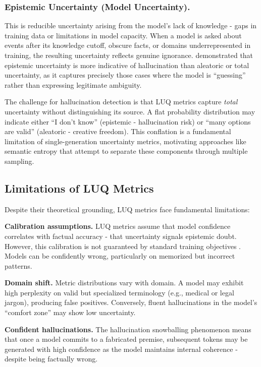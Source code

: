 \subsubsection{Epistemic Uncertainty (Model Uncertainty).} This is reducible uncertainty arising from the model's lack of knowledge - gaps in training data or limitations in model capacity. When a model is asked about events after its knowledge cutoff, obscure facts, or domains underrepresented in training, the resulting uncertainty reflects genuine ignorance. \citet{xiao-wang-2021-hallucination} demonstrated that epistemic uncertainty is more indicative of hallucination than aleatoric or total uncertainty, as it captures precisely those cases where the model is ``guessing'' rather than expressing legitimate ambiguity.

The challenge for hallucination detection is that LUQ metrics capture \textit{total} uncertainty without distinguishing its source. A flat probability distribution may indicate either ``I don't know'' (epistemic - hallucination risk) or ``many options are valid'' (aleatoric - creative freedom). This conflation is a fundamental limitation of single-generation uncertainty metrics, motivating approaches like semantic entropy \citep{farquhar2024detecting} that attempt to separate these components through multiple sampling.

\subsection{Limitations of LUQ Metrics}

Despite their theoretical grounding, LUQ metrics face fundamental limitations:

\noindent\textbf{Calibration assumptions.} LUQ metrics assume that model confidence correlates with factual accuracy - that uncertainty signals epistemic doubt. However, this calibration is not guaranteed by standard training objectives \citep{kadavath2022language}. Models can be confidently wrong, particularly on memorized but incorrect patterns.

\noindent\textbf{Domain shift.} Metric distributions vary with domain. A model may exhibit high perplexity on valid but specialized terminology (e.g., medical or legal jargon), producing false positives. Conversely, fluent hallucinations in the model's ``comfort zone'' may show low uncertainty.

\noindent\textbf{Confident hallucinations.} The hallucination snowballing phenomenon \citep{zhang2023language} means that once a model commits to a fabricated premise, subsequent tokens may be generated with high confidence as the model maintains internal coherence - despite being factually wrong.

